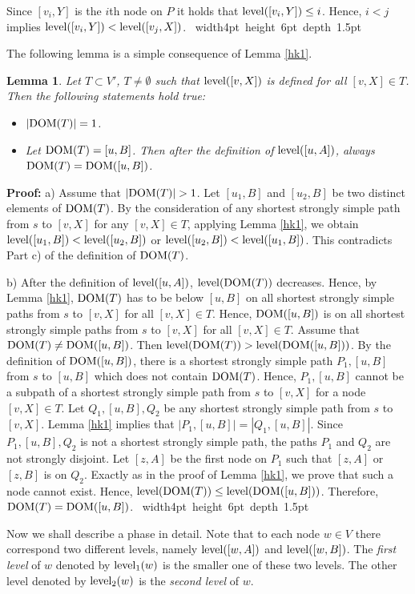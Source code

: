 \documentclass[12pt,twoside,a4paper]{article}
\def\QED{\hbox{\hskip 1pt \vrule width4pt height 6pt depth 1.5pt \hskip 1pt}}
\newtheorem{lemma}{Lemma}
\def\DOM{{\rm DOM}}
\def\lev{{\rm level}}
\begin{document}
Since $[v_i,Y]$ is the $i$th node on $P$ it holds that $\lev([v_i,Y]) \leq i$.
Hence, $i < j$ implies $\lev([v_i,Y]) < \lev([v_j,X])$.
\QED

\medskip
The following lemma is a simple consequence of Lemma \ref{hk1}.
\begin{lemma} \label{hk1a}
Let $T \subset V'$, $T \not= \emptyset$ such that $\lev([v,X])$ is defined for all 
$[v,X] \in T$. Then the following statements hold true:
\begin{itemize}
\item[a)] 
$|\DOM(T)| = 1$.
\item[b)]
Let $\DOM(T) = [u,B]$. Then after the definition of $\lev([u,A])$, always
$\DOM(T) = \DOM([u,B])$.
\end{itemize}
\end{lemma}
{\bf Proof:} a) Assume that $|\DOM(T)| > 1$. Let $[u_1,B]$ and $[u_2,B]$ be two
distinct elements of $\DOM(T)$. By the consideration of any shortest strongly 
simple path from $s$ to $[v,X]$ for any $[v,X] \in T$, applying Lemma \ref{hk1}, we obtain 
$\lev([u_1,B]) < \lev([u_2,B])$ or $\lev([u_2,B]) < \lev([u_1,B])$. This
contradicts Part c) of the definition of $\DOM(T)$.

\medskip
\noindent
b)
After the definition of $\lev([u,A])$, $\lev(\DOM(T))$ decreases. Hence,
by Lemma \ref{hk1}, 
$\DOM(T)$ has to be below $[u,B]$ on all shortest strongly simple paths from
$s$ to $[v,X]$ for all $[v,X] \in T$. Hence, $\DOM([u,B])$ is on all shortest strongly 
simple paths from $s$ to $[v,X]$ for all $[v,X] \in T$. Assume that 
$\DOM(T) \not= \DOM([u,B])$. Then $\lev(\DOM(T)) > \lev(\DOM([u,B]))$. 
By the definition of $\DOM([u,B])$, there is a shortest strongly simple path $P_1,[u,B]$ 
from $s$ to $[u,B]$ 
which does not contain $\DOM(T)$. Hence, $P_1,[u,B]$ cannot be a subpath of a shortest 
strongly simple path from $s$ to $[v,X]$ for a node $[v,X] \in T$. Let $Q_1,[u,B],Q_2$ 
be any shortest strongly simple path from $s$ 
to $[v,X]$. Lemma \ref{hk1} implies that $|P_1,[u,B]| = |Q_1,[u,B]|$. Since 
$P_1,[u,B],Q_2$ is not a shortest strongly simple path, the paths $P_1$ and $Q_2$ are 
not strongly disjoint. Let $[z,A]$ be the first node on $P_1$ such that $[z,A]$ or $[z,B]$ 
is on $Q_2$. Exactly as in the proof of Lemma \ref{hk1}, we prove that such a node cannot 
exist. Hence, $\lev(\DOM(T)) \leq \lev(\DOM([u,B]))$. Therefore, $\DOM(T) = \DOM([u,B])$.
\QED

\medskip
Now we shall describe a phase in detail. Note that to each node $w \in V$ there correspond 
two different levels, namely $\lev([w,A])$ and $\lev([w,B])$. The {\em first level} of $w$ 
denoted by $\lev_1(w)$ is the smaller one of these two levels. The other level denoted by 
$\lev_2(w)$ is the {\em second level} of $w$.
\end{document}
